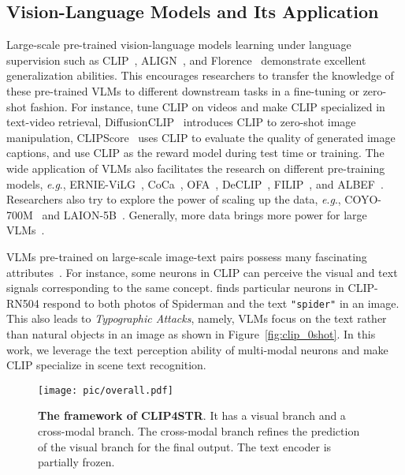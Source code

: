 \documentclass[lettersize,journal]{IEEEtran}
\newcommand{\eg}{\textit{e}.\textit{g}.}
\begin{document}
\subsection{Vision-Language Models and Its Application}
Large-scale pre-trained vision-language models learning under
language supervision such as CLIP~\cite{2021-clip}, ALIGN~\cite{2021-align}, and Florence~\cite{2021_florence} demonstrate excellent generalization abilities.
This encourages researchers to transfer the knowledge of these pre-trained VLMs to different downstream tasks in a fine-tuning or zero-shot fashion.
For instance, \cite{2022_clip4clip,2022_centerclip,wang2022align} tune CLIP on videos and make CLIP specialized in text-video retrieval,
DiffusionCLIP~\cite{2022_DiffusionCLIP} introduces CLIP to zero-shot image manipulation,
CLIPScore~\cite{2021_CLIPScore} uses CLIP to evaluate the quality of generated image captions,
and \cite{zhao2023rlcf,Cho2022CLIPReward} use CLIP as the reward model during test time or training.
The wide application of VLMs also facilitates the research on different pre-training models, \eg,
ERNIE-ViLG~\cite{2021_ERNIE-ViLG}, CoCa~\cite{2022_coca}, OFA~\cite{2022_ofa},
DeCLIP~\cite{li2021supervision}, FILIP~\cite{2022_filip}, and ALBEF~\cite{2021_li_albef}.
Researchers also try to explore the power of scaling up the data, \eg, COYO-700M~\cite{kakaobrain2022coyo-700m} and LAION-5B~\cite{2022_laion5b}.
Generally, more data brings more power for large VLMs~\cite{ilharco_gabriel_2021_5143773}.

VLMs pre-trained on large-scale image-text pairs possess many fascinating attributes~\cite{2021-clip,goh2021multimodal,2022_shen_how}.
For instance, some neurons in CLIP can perceive the visual and text signals corresponding to the same concept.
\cite{goh2021multimodal} finds particular neurons in CLIP-RN504 respond to both photos of Spiderman and the text \texttt{"spider"} in an image.
This also leads to \textit{Typographic Attacks}, namely, VLMs focus on the text rather than natural objects in an image as shown in Figure~\ref{fig:clip_0shot}.
In this work, we leverage the text perception ability of multi-modal neurons and make CLIP specialize in scene text recognition.



\begin{figure*}[!t]
	\centering
	\texttt{[image: pic/overall.pdf]}
	\caption{\textbf{The framework of CLIP4STR}. It has a visual branch and a cross-modal branch.
 The cross-modal branch refines the prediction of the visual branch for the final output.
 The text encoder is partially frozen.}
	\label{fig:overall}
\end{figure*}
\end{document}
